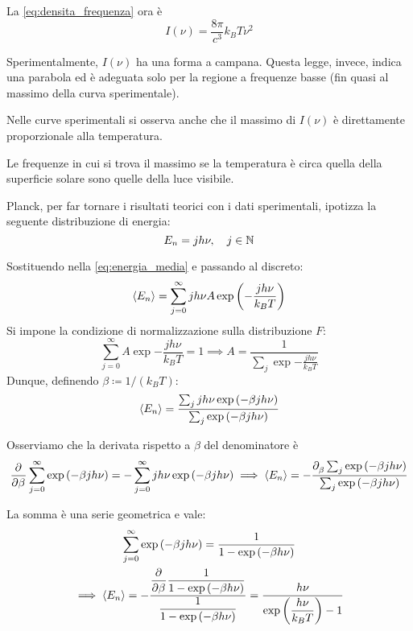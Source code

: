 La \eqref{eq:densita_frequenza} ora è
\begin{equation}
    I(\nu) = \frac{8\pi}{c^3} k_B T \nu^2
\end{equation}

Sperimentalmente, $I(\nu)$ ha una forma a campana.
Questa legge, invece, indica una parabola ed è adeguata solo per la regione a frequenze basse (fin quasi al massimo della curva sperimentale).

Nelle curve sperimentali si osserva anche che il massimo di $I(\nu)$ è direttamente proporzionale alla temperatura.

Le frequenze in cui si trova il massimo se la temperatura è circa quella della superficie solare sono quelle della luce visibile.

Planck, per far tornare i risultati teorici con i dati sperimentali, ipotizza la seguente distribuzione di energia:
\begin{equation}
    {E_n} = j h \nu, \quad j \in \mathbb{N}
\end{equation}

Sostituendo nella \eqref{eq:energia_media} e passando al discreto:
\begin{equation}
    \left\langle {E_n} \right\rangle = \sum_{j = 0}^{\infty} j h \nu A \operatorname{exp}\left( -\frac{j h \nu}{k_B T} \right)
\end{equation}
Si impone la condizione di normalizzazione sulla distribuzione $F$:
\begin{equation}
    \sum_{j = 0}^{\infty} A \exp{-\frac{j h \nu}{k_B T}} = 1
    \implies A = \frac{1}{\sum_j \exp{-\frac{j h \nu}{k_B T}}}
\end{equation}
Dunque, definendo $\beta \coloneq 1/(k_B T)$:
\begin{equation}
    \left\langle {E_n} \right\rangle = \frac{\sum_j j h \nu \operatorname{exp}\left( -\beta j h \nu \right)}{\sum_j \operatorname{exp}\left( -\beta j h \nu \right)}
\end{equation}

Osserviamo che la derivata rispetto a $\beta$ del denominatore è
\begin{equation}
    \parder{\beta} \sum_{j = 0}^\infty \exp{-\beta j h \nu}
    = - \sum_{j = 0}^\infty j h \nu \exp{-\beta j h \nu} \implies \avg{\energy}
    = -\frac{\parder{\beta} \sum_j \exp{-\beta j h \nu}}{\sum_j \exp{-\beta j h \nu}}
\end{equation}

La somma è una serie geometrica e vale:
\begin{gather}
    \sum_{j = 0}^\infty \exp{-\beta j h \nu} = \frac{1}{1 - \exp{-\beta h \nu}} \\
    \implies
    \avg{\energy} = -\frac{\displaystyle\parder{\beta} \dfrac{1}{1 - \exp{-\beta h \nu}}}{\dfrac{1}{1 - \exp{-\beta h \nu}}}
    = \frac{h \nu}{\exp{\dfrac{h \nu}{k_B T}} - 1}
\end{gather}

